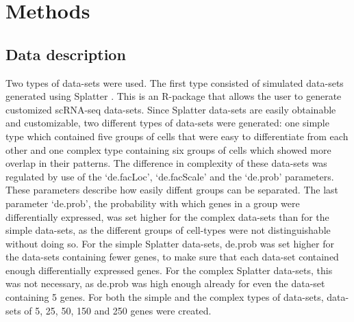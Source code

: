 \chapter{Methods}\label{sec:methods}

\section{Data description}\label{sec:data}
Two types of data-sets were used. The first type consisted of simulated data-sets generated using Splatter \cite{zappia2017splatter}. This is an R-package that allows the user to generate customized scRNA-seq data-sets. Since Splatter data-sets are easily obtainable and customizable, two different types of data-sets were generated: one simple type which contained five groups of cells that were easy to differentiate from each other and one complex type containing six groups of cells which showed more overlap in their patterns. The difference in complexity of these data-sets was regulated by use of the `de.facLoc', `de.facScale' and the `de.prob' parameters. These parameters describe how easily diffent groups can be separated. The last parameter `de.prob', the probability with which genes in a group were differentially expressed, was set higher for the complex data-sets than for the simple data-sets, as the different groups of cell-types were not distinguishable without doing so. For the simple Splatter data-sets, de.prob was set higher for the data-sets containing fewer genes, to make sure that each data-set contained enough differentially expressed genes. For the complex Splatter data-sets, this was not necessary, as de.prob was high enough already for even the data-set containing 5 genes. For both the simple and the complex types of data-sets, data-sets of 5, 25, 50, 150 and 250 genes were created.

